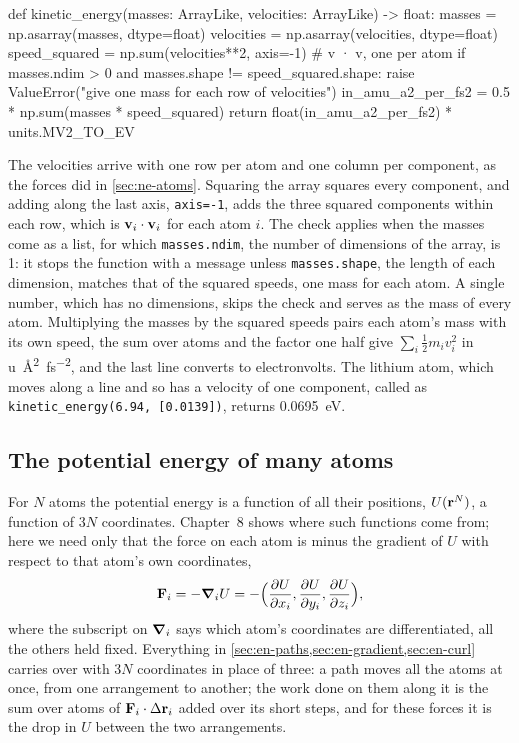 \begin{code}
def kinetic_energy(masses: ArrayLike, velocities: ArrayLike) -> float:
    masses = np.asarray(masses, dtype=float)
    velocities = np.asarray(velocities, dtype=float)
    speed_squared = np.sum(velocities**2, axis=-1)  # v · v, one per atom
    if masses.ndim > 0 and masses.shape != speed_squared.shape:
        raise ValueError("give one mass for each row of velocities")
    in_amu_a2_per_fs2 = 0.5 * np.sum(masses * speed_squared)
    return float(in_amu_a2_per_fs2) * units.MV2_TO_EV
\end{code}

The velocities arrive with one row per atom and one column per component,
as the forces did in \cref{sec:ne-atoms}. Squaring the array squares every
component, and adding along the last axis, \texttt{axis=-1}, adds the
three squared components within each row, which is $\bm{\mathrm{v}}_i\cdot
\bm{\mathrm{v}}_i$ for each atom $i$. The check applies when the masses come as a
list, for which \texttt{masses.ndim}, the number of dimensions of the
array, is 1: it stops the function with a message unless
\texttt{masses.shape}, the length of each dimension, matches that of the
squared speeds, one mass for each atom. A single number, which has no
dimensions, skips the check and serves as the mass of every atom. Multiplying the masses by the squared
speeds pairs each atom's mass with its own speed, the sum over atoms and
the factor one half give $\sum_i\frac12 m_i v_i^2$ in
\si{\amu\angstrom\squared\per\femto\second\squared}, and the last line
converts to electronvolts. The lithium atom, which moves along a line
and so has a velocity of one component, called as
\texttt{kinetic\_energy(6.94, [0.0139])}, returns
\SI{0.0695}{\electronvolt}.

\subsection*{The potential energy of many atoms}

For $N$ atoms the potential energy is a function of all their positions,
$U(\bm{\mathrm{r}}^N)$, a function of $3N$ coordinates. Chapter~8 shows where such
functions come from; here we need only that the force on each atom is
minus the gradient of $U$ with respect to that atom's own coordinates,
\begin{equation}
   \bm{\mathrm{F}}_i = -\bm{\nabla}_i U
   = -\Bigl(\frac{\partial U}{\partial x_i}, \frac{\partial U}{\partial
   y_i}, \frac{\partial U}{\partial z_i}\Bigr) ,
   \label{eq:en-force-atoms}
\end{equation}
where the subscript on $\bm{\nabla}_i$ says which atom's coordinates are
differentiated, all the others held fixed. Everything in
\cref{sec:en-paths,sec:en-gradient,sec:en-curl} carries over with $3N$
coordinates in place of three: a path moves all the atoms at once, from
one arrangement to another; the work done on them along it is the sum
over atoms of $\bm{\mathrm{F}}_i\cdot\Delta\bm{\mathrm{r}}_i$ added over its short steps,
and for these forces it is the drop in $U$ between the two
arrangements.


